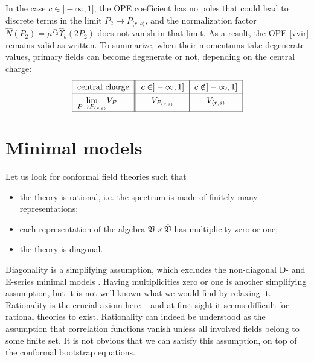 \documentclass[12pt, a4paper, notitlepage, twoside]{report}
\numberwithin{equation}{section}
\theoremstyle{break}
\begin{document}
In the case $c\in]-\infty, 1]$, the OPE coefficient has no poles that could lead to discrete terms in the limit $P_2\to P_{\langle r,s\rangle}$, and the normalization factor $\hat N(P_2) = \mu^{P_2}\hat\Upsilon_b(2P_2)$ does not vanish in that limit. As a result, the OPE \eqref{vvir} remains valid as written. To summarize, when their momentums take degenerate values, primary fields can become degenerate or not, depending on the central charge:
\begin{align}
\renewcommand{\arraystretch}{1.3}
 \begin{tabular}{|l||c|c|}
  \hline
  central charge &  $c\in ]-\infty, 1]$ & $c\notin ]-\infty, 1]$
  \\
  \hline
  $\underset{P\to P_{\langle r,s \rangle}}{\lim } V_P$ & $ V_{P_{\langle r,s \rangle}}$  & $V_{\langle r,s \rangle}$ 
  \\
  \hline
 \end{tabular}
\end{align}



\section{Minimal models \label{secvmm}}


Let us look for conformal field theories such that
\begin{itemize}
\item the theory is rational, i.e.
the spectrum is made of finitely many representations;
\item each representation of the algebra $\mathfrak{V}\times \overline{\mathfrak{V}}$ has multiplicity zero or one;
\item the theory is diagonal.
\end{itemize}
Diagonality is a simplifying assumption, which excludes the non-diagonal D- and E-series minimal models \cite{fms97}.
Having multiplicities zero or one is another simplifying assumption, but it is not well-known what we would find by relaxing it. 
Rationality is the crucial axiom here -- and at first sight it seems difficult for rational theories to exist.
Rationality can indeed be understood as the assumption that correlation functions vanish unless all involved fields belong to some finite set.
It is not obvious that we can satisfy this assumption, on top of the conformal bootstrap equations.
\end{document}
